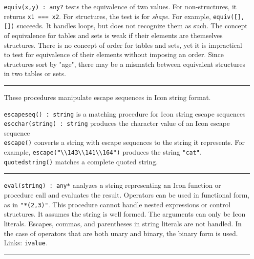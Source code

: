 \texttt{equiv(x,y) : any?} tests the equivalence of two values. For
non-structures, it returns \texttt{x1 === x2}. For structures, the test
is for \textit{shape}. For example,
\texttt{equiv([],[])} succeeds. It handles loops, but does not
recognize them as such. The concept of equivalence for tables and sets
is weak if their elements are themselves structures. There
is no concept of order for tables and sets, yet it is impractical to
test for equivalence of their elements without imposing an order. Since
structures sort by "age", there may be a
mismatch between equivalent structures in two tables or sets. 

\vspace{0.25cm}\hrule{}

These procedures manipulate escape sequences in
Icon string format.

\texttt{escapeseq() : string} is a matching procedure for Icon string
escape sequences\\
\texttt{escchar(string) : string} produces the character value of an
Icon escape sequence\\
\texttt{escape()} converts a string with escape sequences to the string it
represents. For example,
\texttt{escape("{\textbackslash}{\textbackslash}143{\textbackslash}{\textbackslash}141{\textbackslash}{\textbackslash}164")}
produces the string \texttt{"cat"}.\\
\texttt{quotedstring()} matches a complete quoted string.

\vspace{0.25cm}\hrule{}

\texttt{eval(string) : any*} analyzes a string
representing an Icon function or procedure call and evaluates the
result. Operators can be used in functional form, as in
\texttt{"*(2,3)"}. This procedure cannot
handle nested expressions or control structures. It assumes the string
is well formed. The arguments can only be Icon literals. Escapes,
commas, and parentheses in string literals are not handled. In the case
of operators that are both unary and binary, the binary form is used.
Links: \texttt{ivalue}. 

\vspace{0.25cm}\hrule{}

